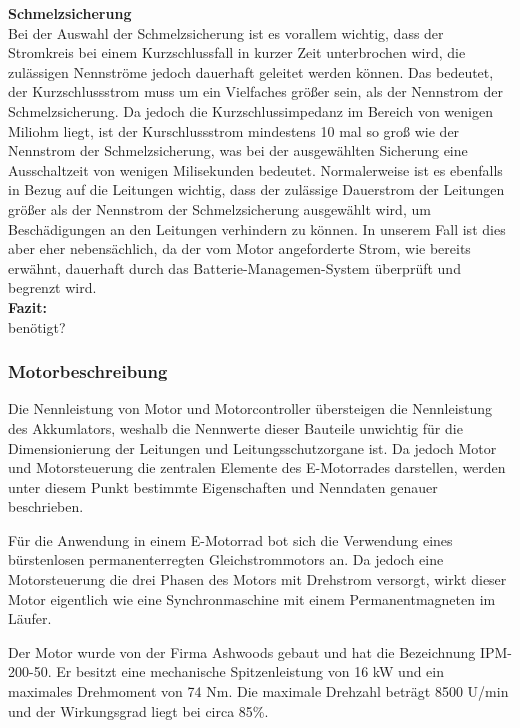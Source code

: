 \textbf{Schmelzsicherung}
 \\[2mm]
Bei der Auswahl der Schmelzsicherung ist es vorallem wichtig, dass der Stromkreis bei einem Kurzschlussfall in kurzer Zeit unterbrochen wird, die zulässigen Nennströme jedoch dauerhaft geleitet werden können. Das bedeutet, der Kurzschlussstrom muss um ein Vielfaches größer sein, als der Nennstrom der Schmelzsicherung. Da jedoch die Kurzschlussimpedanz im Bereich von wenigen Miliohm liegt, ist der Kurschlussstrom mindestens 10 mal so groß wie der Nennstrom der Schmelzsicherung, was bei der ausgewählten Sicherung eine Ausschaltzeit von wenigen Milisekunden bedeutet. Normalerweise ist es ebenfalls in Bezug auf die Leitungen wichtig, dass der zulässige Dauerstrom der Leitungen größer als der Nennstrom der Schmelzsicherung ausgewählt wird, um Beschädigungen an den Leitungen verhindern zu können. In unserem Fall ist dies aber eher nebensächlich, da der vom Motor angeforderte Strom, wie bereits erwähnt, dauerhaft durch das Batterie-Managemen-System überprüft und begrenzt wird.
\\[3mm]

\textbf{Fazit:}
\\[2mm]
benötigt?

\newpage

\subsubsection{Motorbeschreibung}
Die Nennleistung von Motor und Motorcontroller übersteigen die Nennleistung des Akkumlators, weshalb die Nennwerte dieser Bauteile unwichtig für die Dimensionierung der Leitungen und Leitungsschutzorgane ist. Da jedoch Motor und Motorsteuerung die zentralen Elemente des E-Motorrades darstellen, werden unter diesem Punkt bestimmte Eigenschaften und Nenndaten genauer beschrieben.

Für die Anwendung in einem E-Motorrad bot sich die Verwendung eines bürstenlosen  permanenterregten Gleichstrommotors an. Da jedoch eine Motorsteuerung die drei Phasen des Motors mit Drehstrom versorgt, wirkt dieser Motor eigentlich wie eine Synchronmaschine mit einem Permanentmagneten im Läufer. 

Der Motor wurde von der Firma Ashwoods gebaut und hat die Bezeichnung \glqq IPM-200-50\grqq{}. Er besitzt eine mechanische Spitzenleistung von 16 kW und ein maximales Drehmoment von 74 Nm. Die maximale Drehzahl beträgt 8500 U/min und der Wirkungsgrad liegt bei circa 85\%.

